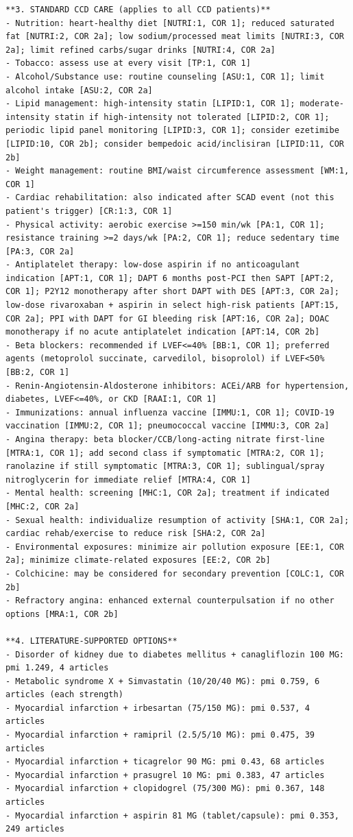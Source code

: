 \begin{lstlisting}
**3. STANDARD CCD CARE (applies to all CCD patients)**
- Nutrition: heart-healthy diet [NUTRI:1, COR 1]; reduced saturated fat [NUTRI:2, COR 2a]; low sodium/processed meat limits [NUTRI:3, COR 2a]; limit refined carbs/sugar drinks [NUTRI:4, COR 2a]
- Tobacco: assess use at every visit [TP:1, COR 1]
- Alcohol/Substance use: routine counseling [ASU:1, COR 1]; limit alcohol intake [ASU:2, COR 2a]
- Lipid management: high-intensity statin [LIPID:1, COR 1]; moderate-intensity statin if high-intensity not tolerated [LIPID:2, COR 1]; periodic lipid panel monitoring [LIPID:3, COR 1]; consider ezetimibe [LIPID:10, COR 2b]; consider bempedoic acid/inclisiran [LIPID:11, COR 2b]
- Weight management: routine BMI/waist circumference assessment [WM:1, COR 1]
- Cardiac rehabilitation: also indicated after SCAD event (not this patient's trigger) [CR:1:3, COR 1]
- Physical activity: aerobic exercise >=150 min/wk [PA:1, COR 1]; resistance training >=2 days/wk [PA:2, COR 1]; reduce sedentary time [PA:3, COR 2a]
- Antiplatelet therapy: low-dose aspirin if no anticoagulant indication [APT:1, COR 1]; DAPT 6 months post-PCI then SAPT [APT:2, COR 1]; P2Y12 monotherapy after short DAPT with DES [APT:3, COR 2a]; low-dose rivaroxaban + aspirin in select high-risk patients [APT:15, COR 2a]; PPI with DAPT for GI bleeding risk [APT:16, COR 2a]; DOAC monotherapy if no acute antiplatelet indication [APT:14, COR 2b]
- Beta blockers: recommended if LVEF<=40% [BB:1, COR 1]; preferred agents (metoprolol succinate, carvedilol, bisoprolol) if LVEF<50% [BB:2, COR 1]
- Renin-Angiotensin-Aldosterone inhibitors: ACEi/ARB for hypertension, diabetes, LVEF<=40%, or CKD [RAAI:1, COR 1]
- Immunizations: annual influenza vaccine [IMMU:1, COR 1]; COVID-19 vaccination [IMMU:2, COR 1]; pneumococcal vaccine [IMMU:3, COR 2a]
- Angina therapy: beta blocker/CCB/long-acting nitrate first-line [MTRA:1, COR 1]; add second class if symptomatic [MTRA:2, COR 1]; ranolazine if still symptomatic [MTRA:3, COR 1]; sublingual/spray nitroglycerin for immediate relief [MTRA:4, COR 1]
- Mental health: screening [MHC:1, COR 2a]; treatment if indicated [MHC:2, COR 2a]
- Sexual health: individualize resumption of activity [SHA:1, COR 2a]; cardiac rehab/exercise to reduce risk [SHA:2, COR 2a]
- Environmental exposures: minimize air pollution exposure [EE:1, COR 2a]; minimize climate-related exposures [EE:2, COR 2b]
- Colchicine: may be considered for secondary prevention [COLC:1, COR 2b]
- Refractory angina: enhanced external counterpulsation if no other options [MRA:1, COR 2b]

**4. LITERATURE-SUPPORTED OPTIONS**
- Disorder of kidney due to diabetes mellitus + canagliflozin 100 MG: pmi 1.249, 4 articles
- Metabolic syndrome X + Simvastatin (10/20/40 MG): pmi 0.759, 6 articles (each strength)
- Myocardial infarction + irbesartan (75/150 MG): pmi 0.537, 4 articles
- Myocardial infarction + ramipril (2.5/5/10 MG): pmi 0.475, 39 articles
- Myocardial infarction + ticagrelor 90 MG: pmi 0.43, 68 articles
- Myocardial infarction + prasugrel 10 MG: pmi 0.383, 47 articles
- Myocardial infarction + clopidogrel (75/300 MG): pmi 0.367, 148 articles
- Myocardial infarction + aspirin 81 MG (tablet/capsule): pmi 0.353, 249 articles


\end{lstlisting}
